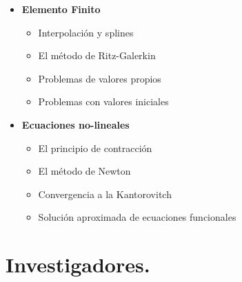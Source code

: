\documentclass[10pt,a4paper]{article}
\begin{document}
\begin{itemize}
    \item \textbf{Elemento Finito}
    \begin{itemize}
        \item Interpolación y splines
        \item El método de Ritz-Galerkin
        \item Problemas de valores propios
        \item Problemas con valores iniciales
    \end{itemize}

    \item \textbf{Ecuaciones no-lineales}
    \begin{itemize}
        \item El principio de contracción
        \item El método de Newton
        \item Convergencia a la Kantorovitch
        \item Solución aproximada de ecuaciones funcionales
    \end{itemize}
\end{itemize}
\newpage
\section{Investigadores.}
\end{document}
